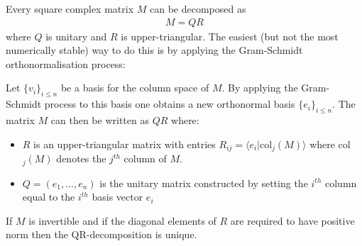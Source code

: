     \begin{method}[QR Decomposition]
        Every square complex matrix $M$ can be decomposed as
        \begin{gather}
            M = QR
        \end{gather}
        where $Q$ is unitary and $R$ is upper-triangular. The easiest (but not the most numerically stable) way to do this is by applying the Gram-Schmidt orthonormalisation process:

        \qquad Let $\{v_i\}_{i\leq n}$ be a basis for the column space of $M$. By applying the Gram-Schmidt process to this basis one obtains a new orthonormal basis $\{e_i\}_{i\leq n}$. The matrix $M$ can then be written as $QR$ where:
        \begin{itemize}
            \item $R$ is an upper-triangular matrix with entries $R_{ij} = \langle e_i|\text{col}_j(M) \rangle$ where col$_j(M)$ denotes the $j^{th}$ column of $M$.
            \item $Q = (e_1,\ldots,e_n)$ is the unitary matrix constructed by setting the $i^{th}$ column equal to the $i^{th}$ basis vector $e_i$
        \end{itemize}
    \end{method}
    \begin{property}
        If $M$ is invertible and if the diagonal elements of $R$ are required to have positive norm then the QR-decomposition is unique.
    \end{property}
